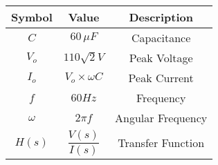 \begin{tabular}{|c|c|c|}
    \hline
     \textbf{Symbol} & \textbf{Value} &
     \textbf{Description}\\
   
    \hline 
     $C$ &  $60\, \mu F$ & Capacitance\\
     
    \hline
     $V_o$ & $110 \sqrt{2}V$ & Peak Voltage  \\
      \hline
       $I_o$ & $V_o \times \omega C$ & Peak Current  \\
      \hline
      
      $f$ & $60 Hz$ & Frequency \\
   
    \hline
     $\omega$ & $ 2\pi f$ & Angular Frequency\\
      \hline
      
     $H(s)$ & $\dfrac{V(s)}{I(s)}$ & Transfer Function \\ 
        \hline

\end{tabular}
